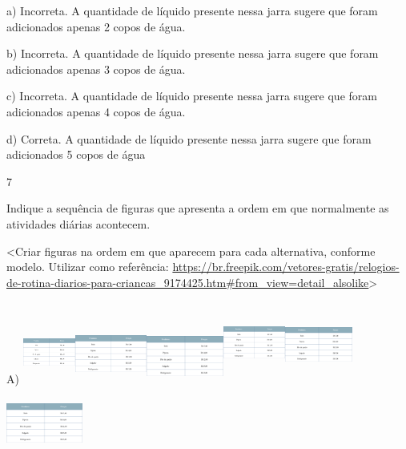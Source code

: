 \begin{escolha}
\begin{escolha}
{{{{a) Incorreta. A quantidade de líquido presente nessa jarra sugere que
foram adicionados apenas 2 copos de água.

b) Incorreta. A quantidade de líquido presente nessa jarra sugere que
foram adicionados apenas 3 copos de água.

c) Incorreta. A quantidade de líquido presente nessa jarra sugere que
foram adicionados apenas 4 copos de água.

d) Correta. A quantidade de líquido presente nessa jarra sugere que
foram adicionados 5 copos de água

\num{7}

Indique a sequência de figuras que apresenta a ordem em que normalmente as
atividades diárias acontecem.

\textless{}Criar figuras na ordem em que aparecem para cada alternativa,
conforme modelo. Utilizar como referência:
\url{https://br.freepik.com/vetores-gratis/relogios-de-rotina-diarios-para-criancas_9174425.htm\#from_view=detail_alsolike}\textgreater{}

A)
\includegraphics[width=0.68193in,height=0.81736in]{media/image148.png}\includegraphics[width=0.92914in,height=0.77678in]{media/image148.png}\includegraphics[width=1.00005in,height=0.71336in]{media/image148.png}\includegraphics[width=0.80414in,height=1.05999in]{media/image148.png}\includegraphics[width=0.86664in,height=1.01803in]{media/image148.png}\includegraphics[width=0.99167in,height=0.93413in]{media/image148.png}

}}}}
\end{escolha}
\end{escolha}
